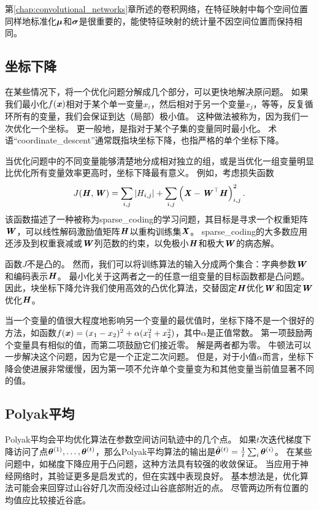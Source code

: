 第\ref{chap:convolutional_networks}章所述的卷积网络，在特征映射中每个空间位置同样地标准化$\boldsymbol{\mu}$和$\boldsymbol{\sigma}$是很重要的，能使特征映射的统计量不因空间位置而保持相同。

\subsection{坐标下降}
\label{sec:coordinate_descent}
在某些情况下，将一个优化问题分解成几个部分，可以更快地解决原问题。
如果我们最小化$f(\boldsymbol{\mathit{x}})$相对于某个单一变量$x_i$，然后相对于另一个变量$x_j$，等等，反复循环所有的变量，我们会保证到达（局部）极小值。
这种做法被称为，因为我们一次优化一个坐标。
更一般地，是指对于某个子集的变量同时最小化。
术语``\gls{coordinate_descent}''通常既指块坐标下降，也指严格的单个坐标下降。


当优化问题中的不同变量能够清楚地分成相对独立的组，或是当优化一组变量明显比优化所有变量效率更高时，坐标下降最有意义。
例如，考虑损失函数
\begin{equation}
    J(\boldsymbol{\mathit{H}}, \boldsymbol{\mathit{W}}) = \sum_{i,j} |H_{i,j}| + \sum_{i,j} \left( \boldsymbol{\mathit{X}} - \boldsymbol{\mathit{W}}^\top \boldsymbol{\mathit{H}} \right)_{i,j}^2 .
\end{equation}
该函数描述了一种被称为\gls{sparse_coding}的学习问题，其目标是寻求一个权重矩阵$\boldsymbol{\mathit{W}}$，可以线性解码激励值矩阵$\boldsymbol{\mathit{H}}$以重构训练集$\boldsymbol{\mathit{X}}$。
\gls{sparse_coding}的大多数应用还涉及到权重衰减或$\boldsymbol{\mathit{W}}$列范数的约束，以免极小$\boldsymbol{\mathit{H}}$和极大$\boldsymbol{\mathit{W}}$的病态解。

函数$J$不是凸的。
然而，我们可以将训练算法的输入分成两个集合：字典参数$\boldsymbol{\mathit{W}}$和编码表示$\boldsymbol{\mathit{H}}$。
最小化关于这两者之一的任意一组变量的目标函数都是凸问题。
因此，块坐标下降允许我们使用高效的凸优化算法，交替固定$\boldsymbol{\mathit{H}}$优化$\boldsymbol{\mathit{W}}$和固定$\boldsymbol{\mathit{W}}$优化$\boldsymbol{\mathit{H}}$。

当一个变量的值很大程度地影响另一个变量的最优值时，坐标下降不是一个很好的方法，如函数$f(\boldsymbol{\mathit{x}})=(x_1 - x_2)^2+\alpha(x_1^2 + x_2^2)$，其中$\alpha$是正值常数。
第一项鼓励两个变量具有相似的值，而第二项鼓励它们接近零。
解是两者都为零。
牛顿法可以一步解决这个问题，因为它是一个正定二次问题。
但是，对于小值$\alpha$而言，坐标下降会使进展非常缓慢，因为第一项不允许单个变量变为和其他变量当前值显著不同的值。


\subsection{Polyak平均}
\label{sec:polyak_averaging}
Polyak平均\citep{Polyak+Juditsky-1992}会平均优化算法在参数空间访问轨迹中的几个点。
如果$t$次迭代梯度下降访问了点$\boldsymbol{\theta}^{(1)},\dots,\boldsymbol{\theta}^{(t)}$，那么Polyak平均算法的输出是$\hat{\boldsymbol{\theta}}^{(t)} = \frac{1}{t} \sum_i \boldsymbol{\theta}^{(i)}$。
在某些问题中，如梯度下降应用于凸问题，这种方法具有较强的收敛保证。
当应用于神经网络时，其验证更多是启发式的，但在实践中表现良好。
基本想法是，优化算法可能会来回穿过山谷好几次而没经过山谷底部附近的点。
尽管两边所有位置的均值应比较接近谷底。

